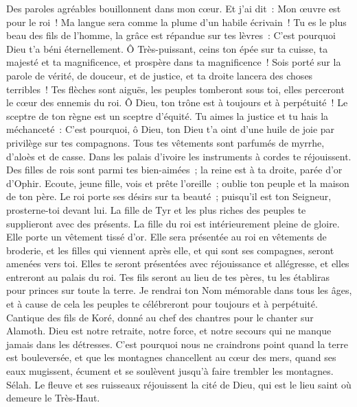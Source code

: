 \begin{multicols}{2}
Des paroles agréables bouillonnent dans mon cœur. Et j'ai dit~: Mon œuvre est pour le roi~! Ma langue sera comme la plume d'un habile écrivain~!
Tu es le plus beau des fils de l'homme, la grâce est répandue sur tes lèvres~: C'est pourquoi Dieu t'a béni éternellement.
Ô Très-puissant, ceins ton épée sur ta cuisse, ta majesté et ta magnificence,
et prospère dans ta magnificence~! Sois porté sur la parole de vérité, de douceur, et de justice, et ta droite lancera des choses terribles~!
Tes flèches sont aiguës, les peuples tomberont sous toi, elles perceront le cœur des ennemis du roi.
Ô Dieu, ton trône est à toujours et à perpétuité~! Le sceptre de ton règne est un sceptre d'équité.
Tu aimes la justice et tu hais la méchanceté~: C'est pourquoi, ô Dieu, ton Dieu t'a oint d'une huile de joie par privilège sur tes compagnons.
Tous tes vêtements sont parfumés de myrrhe, d'aloès et de casse. Dans les palais d'ivoire les instruments à cordes te réjouissent.
Des filles de rois sont parmi tes bien-aimées~; la reine est à ta droite, parée d'or d'Ophir.
Ecoute, jeune fille, vois et prête l'oreille~; oublie ton peuple et la maison de ton père.
Le roi porte ses désirs sur ta beauté~; puisqu'il est ton Seigneur, prosterne-toi devant lui.
La fille de Tyr et les plus riches des peuples te supplieront avec des présents.
La fille du roi est intérieurement pleine de gloire. Elle porte un vêtement tissé d'or.
Elle sera présentée au roi en vêtements de broderie, et les filles qui viennent après elle, et qui sont ses compagnes, seront amenées vers toi.
Elles te seront présentées avec réjouissance et allégresse, et elles entreront au palais du roi.
Tes fils seront au lieu de tes pères, tu les établiras pour princes sur toute la terre.
Je rendrai ton Nom mémorable dans tous les âges, et à cause de cela les peuples te célébreront pour toujours et à perpétuité.
\VerseOne{}Cantique des fils de Koré, donné au chef des chantres pour le chanter sur Alamoth. 
Dieu est notre retraite, notre force, et notre secours qui ne manque jamais dans les détresses.
C'est pourquoi nous ne craindrons point quand la terre est bouleversée, et que les montagnes chancellent au cœur des mers,
quand ses eaux mugissent, écument et se soulèvent jusqu'à faire trembler les montagnes. Sélah.
Le fleuve et ses ruisseaux réjouissent la cité de Dieu, qui est le lieu saint où demeure le Très-Haut.

\end{multicols}
